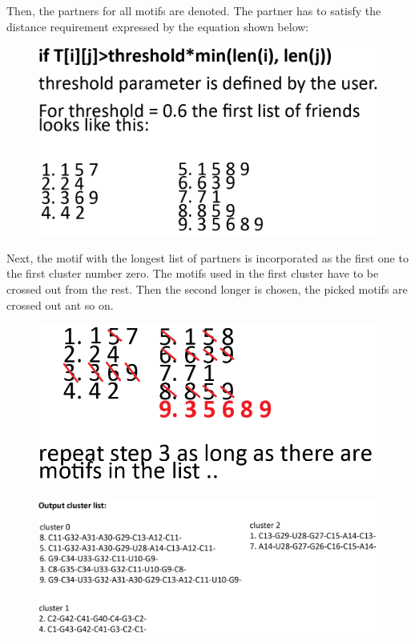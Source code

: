 \documentclass[12pt]{article}
\begin{document}
\newpage
Then, the partners for all motifs are denoted. The partner has to satisfy the distance requirement expressed by the equation shown below:
\begin{figure}[h!]
\centering
\includegraphics[scale=1]{./pictures/cluster_motif_step3.png}
\label{MotifsClusteringStep3}
\end{figure}

Next, the motif with the longest list of partners is incorporated as the first one to the first cluster number zero. The motifs used in the first cluster have to be crossed out from the rest. Then the second longer is chosen, the picked motifs are crossed out ant so on.  

\begin{figure}[h!]
\centering
\includegraphics[scale=1]{./pictures/cluster_motif_step4.png}
\label{MotifsClusteringStep4}
\end{figure}

\begin{figure}[h!]
\centering
\includegraphics[scale=1]{./pictures/cluster_motif_step5.png}
\label{MotifsClusteringStep5}
\end{figure}
\end{document}
